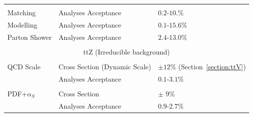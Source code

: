 \begin{table}[htbp]
\begin{center}
{\begin{tabular}{|lll|}
         & &                \\
      Matching          &   Analyses Acceptance  &        $0.2$-$10.\%$       \\
      Modelling         &   Analyses Acceptance  &        $0.1$-$15.6\%$       \\
      Parton Shower     &   Analyses Acceptance  &        $2.4$-$13.0\%$       \\
         & &                 \\
     \hline
      \multicolumn{3}{|c|}{ttZ (Irreducible background)}\\
     \hline
         &  &                 \\
      QCD Scale                    & Cross Section (Dynamic Scale)     &    $\pm12\%$     (Section~\ref{section:ttV})\\
                                            & Analyses Acceptance              &    $0.1$-$3.1\%$          \\
         & &                 \\
      PDF+$\alpha_S$     &   Cross Section  &         $\pm$ 9$\%$       \\
                                      &   Analyses Acceptance          &     $0.9$-$2.7\%$      \\
      

\end{tabular}}
\end{center}
\end{table}
